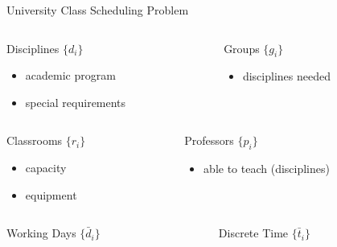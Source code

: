 \documentclass{beamer}
\begin{document}
\begin{frame}{University Class Scheduling Problem}
  \begin{columns}[t]
    \begin{column}{.4\textwidth}
      \begin{block}{Disciplines $\{d_i\}$}
        \begin{itemize}
          \item academic program
          \item special requirements
        \end{itemize}
      \end{block}
    \end{column}
    \begin{column}{.4\textwidth}
      \begin{block}{Groups $\{g_i\}$}
        \begin{itemize}
          \item disciplines needed
        \end{itemize}
      \end{block}
    \end{column}
  \end{columns}
  \begin{columns}[t]
    \begin{column}{.4\textwidth}
      \begin{block}{Classrooms $\{r_i\}$}
        \begin{itemize}
          \item capacity
          \item equipment
        \end{itemize}
      \end{block}
    \end{column}
    \begin{column}{.4\textwidth}
      \begin{block}{Professors $\{p_i\}$}
        \begin{itemize}
          \item able to teach (disciplines)
        \end{itemize}
      \end{block}
    \end{column}
  \end{columns}
  \begin{columns}
    \begin{column}{.4\textwidth}
      \begin{block}{Working Days $\{\bar{d}_i\}$}\end{block}
    \end{column}
    \begin{column}{.4\textwidth}
      \begin{block}{Discrete Time $\{\bar{t}_i\}$}\end{block}
    \end{column}
  \end{columns}
\end{frame}
\end{document}
